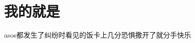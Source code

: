 	\setcounter{page}{1}
	\newpage
	\section{我的就是}
	asos都发生了\cite{ccc}纠纷时看见的饭卡上几\cite{bbb}分恐惧撒开了就分手快乐\cite{aaa}